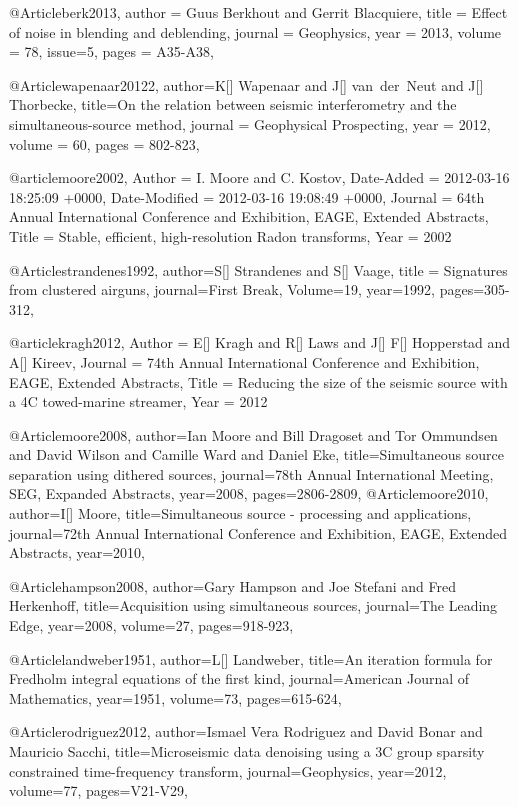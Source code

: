 @Article{berk2013,
  author = 	 {Guus Berkhout and Gerrit Blacquiere},
  title = 	 {Effect of noise in blending and deblending},
  journal = 	 {Geophysics},
  year = 	 2013,
  volume =	 78,
  issue=5,
  pages =	 {A35-A38},
}


@Article{wapenaar20122,
  author={K[] Wapenaar and J[] van~der~Neut and J[] Thorbecke},
  title={On the relation between seismic interferometry and the simultaneous-source method},
  journal = 	 {Geophysical Prospecting},
  year = 	 2012,
  volume =	 60,
  pages =	 {802-823},
}

@article{moore2002,
	Author = {I. Moore and C. Kostov},
	Date-Added = {2012-03-16 18:25:09 +0000},
	Date-Modified = {2012-03-16 19:08:49 +0000},
	Journal = {64th Annual International Conference and Exhibition, EAGE, Extended Abstracts},
	Title = {Stable, efficient, high-resolution {R}adon transforms},
	Year = {2002}}

@Article{strandenes1992,
  author={S[] Strandenes and S[] Vaage},
  title = {Signatures from clustered airguns},
  journal={First Break},
  Volume=19,
  year=1992,
  pages={305-312},
}

@article{kragh2012,
	Author = {E[] Kragh and R[] Laws and J[] F[] Hopperstad and A[] Kireev},
	Journal = {74th Annual International Conference and Exhibition, EAGE, Extended Abstracts},
	Title = {Reducing the size of the seismic source with a 4C towed-marine streamer},
	Year = {2012}}


@Article{moore2008,
  author={Ian Moore and Bill Dragoset and Tor Ommundsen and David Wilson and Camille Ward and Daniel Eke},
  title={Simultaneous source separation using dithered sources},
  journal={78th Annual International Meeting, SEG, Expanded Abstracts},
  year=2008,
  pages={2806-2809},
}
@Article{moore2010,
  author={I[] Moore},
  title={Simultaneous source - processing and applications},
  journal={72th Annual International Conference and Exhibition, EAGE, Extended Abstracts},
  year=2010,
}


@Article{hampson2008,
  author={Gary Hampson and Joe Stefani and Fred Herkenhoff},
  title={Acquisition using simultaneous sources},
  journal={The Leading Edge},
  year=2008,
  volume=27,
  pages={918-923},
}

@Article{landweber1951,
  author={L[] Landweber},
  title={An iteration formula for Fredholm integral equations of the first kind},
  journal={American Journal of Mathematics},
  year=1951,
  volume=73,
  pages={615-624},
}

@Article{rodriguez2012,
  author={Ismael Vera Rodriguez and David Bonar and Mauricio Sacchi},
  title={Microseismic data denoising using a 3C group sparsity constrained time-frequency transform},
  journal={Geophysics},
  year=2012,
  volume=77,
  pages={V21-V29},
}

